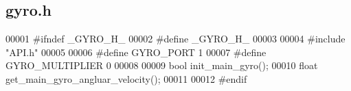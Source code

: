 \subsection{gyro.\+h}
\label{a00020_source}

\begin{DoxyCode}
00001 \textcolor{preprocessor}{#ifndef \_GYRO\_H\_}
00002 \textcolor{preprocessor}{#define \_GYRO\_H\_}
00003 
00004 \textcolor{preprocessor}{#include "API.h"}
00005 
00006 \textcolor{preprocessor}{#define GYRO\_PORT 1}
00007 \textcolor{preprocessor}{#define GYRO\_MULTIPLIER 0}
00008 
00009 \textcolor{keywordtype}{bool} init_main_gyro();
00010 \textcolor{keywordtype}{float} get_main_gyro_angluar_velocity();
00011 
00012 \textcolor{preprocessor}{#endif}
\end{DoxyCode}
